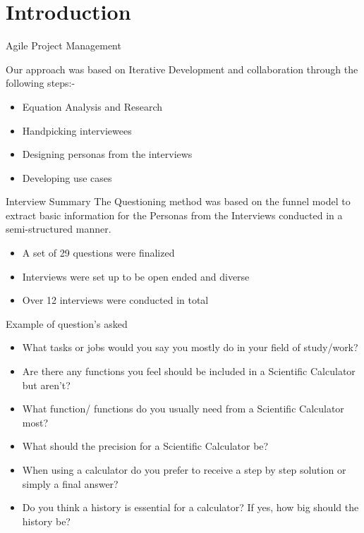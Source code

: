 \documentclass{beamer}
\begin{document}
\section[Research and Planning]{Introduction}

\begin{frame}[fragile]{Agile Project Management}

  Our approach was based on Iterative Development and collaboration through the following steps:-
	\begin{itemize}
		\item Equation Analysis and Research
		\item Handpicking interviewees
		\item Designing personas from the interviews
		\item Developing use cases
	\end{itemize}
\end{frame}

\begin{frame}{Interview Summary}
The Questioning method was based on the funnel model to extract basic information for the Personas from the Interviews conducted in a semi-structured manner.
    \begin{itemize}
		\item A set of 29 questions were finalized
		\item Interviews were set up to be open ended and diverse
		\item Over 12 interviews were conducted in total
	\end{itemize}

\end{frame}

\begin{frame}{Example of question's asked}
   \begin{itemize}
		\item What tasks or jobs would you say you mostly do in your field of study/work?
		\item Are there any functions you feel should be included in a Scientific Calculator but aren’t?
		\item What function/ functions do you usually need from a Scientific Calculator most?
		\item What should the precision for a Scientific Calculator be?
		\item When using a calculator do you prefer to receive a step by step solution or simply a final answer?
		\item Do you think a history is essential for a calculator? If yes, how big should the history be?
	\end{itemize}
\end{frame}
\end{document}
